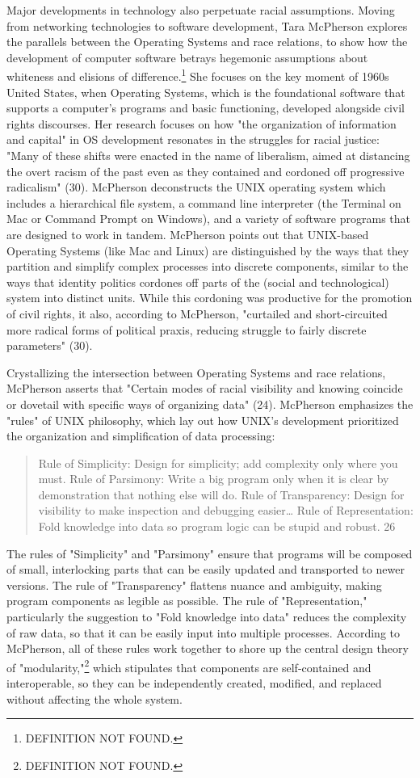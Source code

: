 \documentclass[11pt]{article}
\begin{document}
Major developments in technology also perpetuate racial
assumptions. Moving from networking technologies to software
development, Tara McPherson explores the parallels between the
Operating Systems and race relations, to show how the development of
computer software betrays hegemonic assumptions about whiteness and
elisions of difference.\footnote{DEFINITION NOT FOUND.} She focuses on the key moment of 1960s
United States, when Operating Systems, which is the foundational
software that supports a computer's programs and basic functioning,
developed alongside civil rights discourses. Her research focuses on
how "the organization of information and capital" in OS development
resonates in the struggles for racial justice: "Many of these shifts
were enacted in the name of liberalism, aimed at distancing the overt
racism of the past even as they contained and cordoned off progressive
radicalism" (30). McPherson deconstructs the UNIX operating system
which includes a hierarchical file system, a command line interpreter
(the Terminal on Mac or Command Prompt on Windows), and a variety of
software programs that are designed to work in tandem. McPherson
points out that UNIX-based Operating Systems (like Mac and Linux) are
distinguished by the ways that they partition and simplify complex
processes into discrete components, similar to the ways that identity
politics cordones off parts of the (social and technological) system
into distinct units. While this cordoning was productive for the
promotion of civil rights, it also, according to McPherson, "curtailed
and short-circuited more radical forms of political praxis, reducing
struggle to fairly discrete parameters" (30).

Crystallizing the intersection between Operating Systems and race
relations, McPherson asserts that "Certain modes of racial visibility
and knowing coincide or dovetail with specific ways of organizing
data" (24). McPherson emphasizes the "rules" of UNIX philosophy, which
lay out how UNIX's development prioritized the organization and
simplification of data processing:
\begin{quote}
Rule of Simplicity: Design for simplicity; add complexity only where
you must. Rule of Parsimony: Write a big program only when it is clear
by demonstration that nothing else will do. Rule of Transparency:
Design for visibility to make inspection and debugging easier\ldots{} Rule
of Representation: Fold knowledge into data so program logic can be
stupid and robust. 26
\end{quote}
The rules of "Simplicity" and "Parsimony" ensure that programs will be
composed of small, interlocking parts that can be easily updated and
transported to newer versions. The rule of "Transparency" flattens
nuance and ambiguity, making program components as legible as
possible. The rule of "Representation," particularly the suggestion to
"Fold knowledge into data" reduces the complexity of raw data, so that
it can be easily input into multiple processes. According to
McPherson, all of these rules work together to shore up the central
design theory of "modularity,"\footnote{DEFINITION NOT FOUND.} which stipulates that components
are self-contained and interoperable, so they can be independently
created, modified, and replaced without affecting the whole system.
\end{document}
